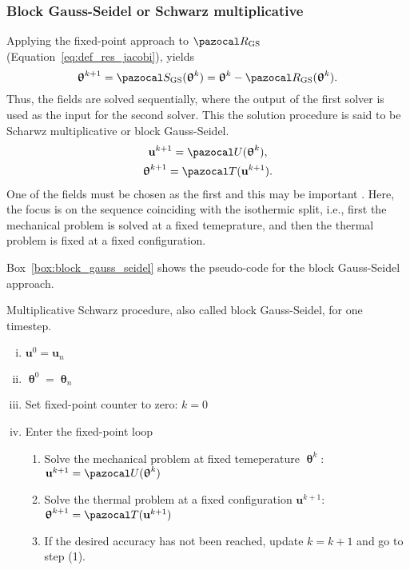 \subsubsection{Block Gauss-Seidel or Schwarz multiplicative}

Applying the fixed-point approach to \(\pazocal R_\mathrm{GS}\) (Equation~\eqref{eq:def_res_jacobi}), yields
\begin{equation}
  \bm\uptheta^{k+1} = \pazocal S_\mathrm{GS}(\bm\uptheta^k) =  \bm\uptheta^k - \pazocal R_\mathrm{GS}(\bm \uptheta^k).
\end{equation}
Thus, the fields are solved sequentially, where the output of the first solver is used as the input for the second solver.
This the solution procedure is said to be Scharwz multiplicative or block Gauss-Seidel.
\begin{gather}
\mathbf u^{k+1}  = \pazocal U(\bm \uptheta^k),\\
\bm \uptheta^{k+1} = \pazocal T(\mathbf u^{k+1}).
\end{gather}
One of the fields must be chosen as the first and this may be important \citep{joosten_analysis_2009}.
Here, the focus is on the sequence coinciding with the isothermic split, i.e., first the mechanical problem is solved at a fixed temeprature, and then the thermal problem is fixed at a fixed configuration.

Box~\ref{box:block_gauss_seidel} shows the pseudo-code for the block Gauss-Seidel approach.

\begin{framedbox}[htb]
  \caption{Multiplicative Schwarz procedure, also called block Gauss-Seidel, for one timestep.}
  \label{box:block_gauss_seidel}
  \begin{center}
    \begin{minipage}{0.9\textwidth}
    \begin{enumerate}[(i)]
    \item \(\mathbf u^0 = \mathbf u_{n}\)
    \item \(\bm \uptheta^0 = \bm \uptheta_n\)
      \item Set fixed-point counter to zero: \(k=0\)
    \item Enter the fixed-point loop
    \begin{enumerate}[(1)]
      \item Solve the mechanical problem at fixed temeperature \(\bm \uptheta^k\): \(\mathbf u^{k+1} = \pazocal U(\bm \uptheta^k)\)
      \item Solve the thermal problem at a fixed configuration \(\mathbf u^{k+1}\): \(\bm \uptheta^{k+1} = \pazocal T(\mathbf u^{k+1})\)
      \item If the desired accuracy has not been reached, update \(k=k+1\) and go to step (1).

    \end{enumerate}
    \end{enumerate}
    \end{minipage}
  \end{center}
\end{framedbox}

